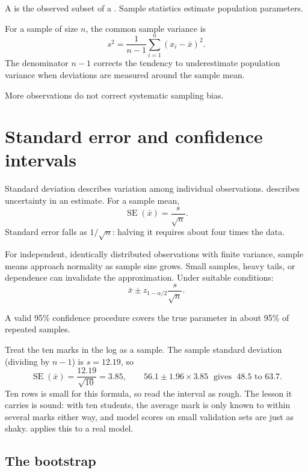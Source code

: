 A  is the observed subset of a . Sample statistics estimate population parameters.

For a sample of size $n$, the common sample variance is
\[
  s^2=\frac{1}{n-1}\sum_{i=1}^{n}(x_i-\bar{x})^2.
\]
The denominator $n-1$ corrects the tendency to underestimate population variance when deviations are measured around the sample mean.

\begin{pitfall}
More observations do not correct systematic sampling bias.
\end{pitfall}

\section{Standard error and confidence intervals}

Standard deviation describes variation among individual observations.  describes uncertainty in an estimate. For a sample mean,
\[
  \operatorname{SE}(\bar{x})=\frac{s}{\sqrt{n}}.
\]
Standard error falls as $1/\sqrt{n}$: halving it requires about four times the data.

For independent, identically distributed observations with finite variance, sample means approach normality as sample size grows. Small samples, heavy tails, or dependence can invalidate the approximation. Under suitable conditions:
\[
  \bar{x}\pm z_{1-\alpha/2}\frac{s}{\sqrt{n}}.
\]

A valid 95\% confidence procedure covers the true parameter in about 95\% of repeated samples.

\begin{workedexample}
Treat the ten marks in the log as a sample. The sample standard deviation (dividing by $n-1$) is $s=12.19$, so
\[
  \operatorname{SE}(\bar{x})=\frac{12.19}{\sqrt{10}}=3.85,
  \qquad
  56.1\pm1.96\times3.85 \;\text{ gives }\; 48.5\text{ to }63.7.
\]
Ten rows is small for this formula, so read the interval as rough. The lesson it carries is sound: with ten students, the average mark is only known to within several marks either way, and model scores on small validation sets are just as shaky.  applies this to a real model.
\end{workedexample}

\subsection{The bootstrap}

